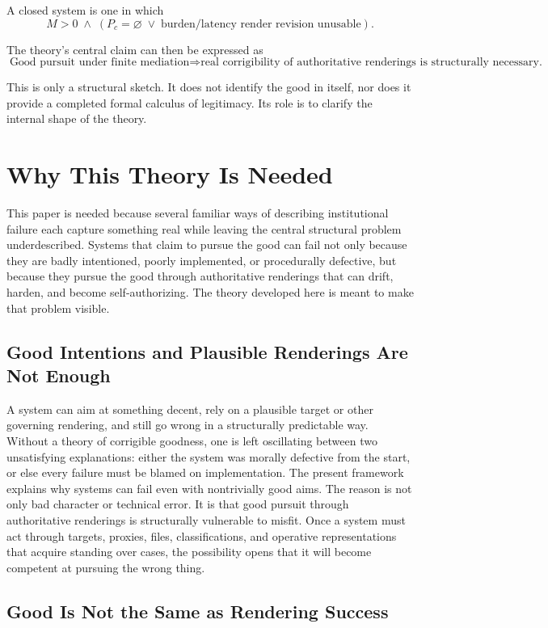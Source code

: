 \documentclass[11pt]{article}
\begin{document}
A closed system is one in which
\[
M > 0 \;\wedge\; (P_c = \varnothing \;\vee\; \text{burden/latency render revision unusable}).
\]

The theory's central claim can then be expressed as
\[
\text{Good pursuit under finite mediation} \Rightarrow \text{real corrigibility of authoritative renderings is structurally necessary.}
\]

This is only a structural sketch. It does not identify the good in itself, nor does it provide a completed formal calculus of legitimacy. Its role is to clarify the internal shape of the theory.
\section{Why This Theory Is Needed}

This paper is needed because several familiar ways of describing institutional failure each capture something real while leaving the central structural problem underdescribed. Systems that claim to pursue the good can fail not only because they are badly intentioned, poorly implemented, or procedurally defective, but because they pursue the good through authoritative renderings that can drift, harden, and become self-authorizing. The theory developed here is meant to make that problem visible.

\subsection{Good Intentions and Plausible Renderings Are Not Enough}

A system can aim at something decent, rely on a plausible target or other governing rendering, and still go wrong in a structurally predictable way. Without a theory of corrigible goodness, one is left oscillating between two unsatisfying explanations: either the system was morally defective from the start, or else every failure must be blamed on implementation. The present framework explains why systems can fail even with nontrivially good aims. The reason is not only bad character or technical error. It is that good pursuit through authoritative renderings is structurally vulnerable to misfit.\cite{Campbell1979AssessingImpactPlannedSocialChange,ManheimGarrabrant2019GoodhartsLaw} Once a system must act through targets, proxies, files, classifications, and operative representations that acquire standing over cases, the possibility opens that it will become competent at pursuing the wrong thing.

\subsection{Good Is Not the Same as Rendering Success}
\end{document}
